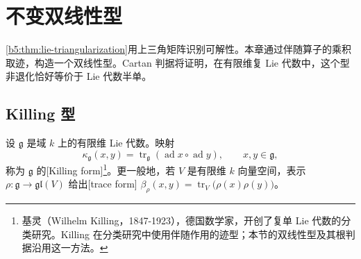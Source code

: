 
\section{不变双线性型}
\label{b5:sec:1301}

%
%

\cref{b5:thm:lie-triangularization}用上三角矩阵识别可解性。本章通过伴随算子的乘积取迹，构造一个双线性型。Cartan 判据将证明，在有限维复 Lie 代数中，这个型非退化恰好等价于 Lie 代数半单。

\subsection{Killing 型}
\label{b5:subsec:1301:01}

\begin{definition}\label{b5:def:killing-form}
	设 \(\mathfrak g\) 是域 \(k\) 上的有限维 Lie 代数。映射
	\[
		\kappa_{\mathfrak g}(x,y) =\operatorname{tr}_{\mathfrak g} \left(\operatorname{ad}x\circ\operatorname{ad}y\right), \qquad x,y\in\mathfrak g,
	\]
	称为 \(\mathfrak g\) 的[Killing form]\footnote{基灵（Wilhelm Killing，1847-1923），德国数学家，开创了复单 Lie 代数的分类研究。Killing 在分类研究中使用伴随作用的迹型；本节的双线性型及其根判据沿用这一方法。}。更一般地，若 \(V\) 是有限维 \(k\) 向量空间，表示 \(\rho:\mathfrak g\rightarrow\mathfrak{gl}(V)\) 给出[trace form] \(\beta_\rho(x,y)=\operatorname{tr}_V\bigl(\rho(x)\rho(y)\bigr)\)。
\end{definition}

